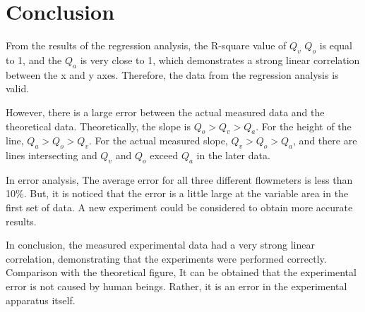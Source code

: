 \section{Conclusion}
\label{sec:conclusion}
From the results of the regression analysis, 
the R-square value of $Q_v$ $Q_o$ is equal to 1, and the $Q_a$ is very close to 1,
which demonstrates a strong linear correlation between the x and y axes.
Therefore, the data from the regression analysis is valid.

However, there is a large error between the actual measured data 
and the theoretical data. Theoretically, the slope is $Q_o>Q_v>Q_a$. For the height of the line, $Q_a>Q_o>Q_v$.
For the actual measured slope, $Q_v>Q_o>Q_a$, 
and there are lines intersecting and $Q_v$ and $Q_o$ exceed $Q_a$ in the later data.

In error analysis, The average error for all three different flowmeters is less than 10\%.
But, it is noticed that the error is a little large at the variable area in the first set of data. 
A new experiment could be considered to obtain more accurate results.

In conclusion, the measured experimental data had a very strong linear correlation, 
demonstrating that the experiments were performed correctly. Comparison with the theoretical figure, 
It can be obtained that the experimental error is not caused by human beings.
Rather, it is an error in the experimental apparatus itself.